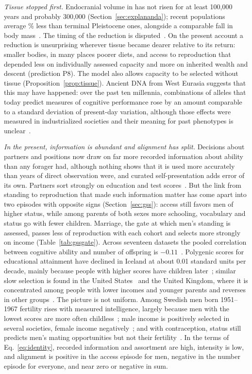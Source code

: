 \emph{Tissue stopped first.} Endocranial volume in \Hs{} has not risen for at least 100,000 years and probably 300,000
(Section~\ref{sec:explananda}); recent populations average \RecentDrop\% less than terminal Pleistocene ones, alongside a
comparable fall in body mass~\cite{ruff1997}. The timing of the reduction is disputed~\cite{desilva2021,villmoare2022,desilva2023}. On
the present account a reduction is unsurprising wherever tissue became dearer relative to its return: smaller bodies,
in many places poorer diets, and access to reproduction that depended less on individually assessed capacity
and more on inherited wealth and descent (prediction P8). The model also allows capacity to be selected without tissue
(Proposition~\ref{prop:tissue}). Ancient DNA from West Eurasia suggests that this may have happened: over the past ten
millennia, combinations of alleles that today predict measures of cognitive performance rose by an amount comparable to a
standard deviation of present-day variation, although those effects were measured in industrialized societies and their
meaning for past phenotypes is unclear~\cite{akbari2026}.

\emph{In the present, information is abundant and alignment has split.} Decisions about partners and positions now draw
on far more recorded information about ability than any forager had, although nothing shows that it is used more accurately
than years of direct observation were, and curated self-presentation adds error of its own. Partners sort strongly on
education and test scores~\cite{horwitz2023}. But the link from standing to reproduction that made such information matter has come apart into two
episodes with opposite signs (Section~\ref{sec:gss}): access still favors men of higher status, while among parents of both
sexes more schooling, vocabulary and status go with fewer children. Marriage, the gate at which men's standing is
assessed, passes less of reproduction with each cohort and selects more strongly on income (Table~\ref{tab:gssgate}). Across seventeen datasets the pooled correlation between cognitive ability and number of offspring is
$-0.11$~\cite{reeve2018}. Polygenic scores for educational attainment have declined in Iceland at about 0.01 standard units
per decade, mainly because people with higher scores have children later~\cite{kong2017}; similar slow selection is found in
the United States~\cite{beauchamp2016} and the United Kingdom, where it is concentrated among people with lower incomes and
younger parents and reverses in other groups~\cite{hughjones2022}. The picture is not uniform. Among Swedish men born
1951--1967 fertility rises with measured intelligence, largely because men with the lowest scores are more often
childless~\cite{kolk2019}; male income is positively selected in several societies, female income
negatively~\cite{nettle2008}; and with contraception, status still predicts men's mating opportunities but not their
fertility~\cite{perusse1993}. In the terms of Eq.~\eqref{eq:identity}, recorded information and assortment are high,
intensity is low, and alignment is positive in the access episode for men, negative in the number episode for everyone, and
near zero or negative in sum.


